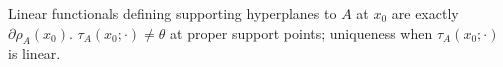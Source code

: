 Linear functionals defining supporting hyperplanes to $A$ at $x_0$ are exactly $\partial\rho_A(x_0)$. $\tau_A(x_0;\cdot)\neq\theta$ at proper support points; uniqueness when $\tau_A(x_0;\cdot)$ is linear.
